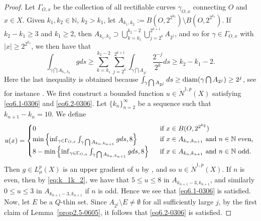 \documentclass[10pt]{amsart}
\numberwithin{equation}{section}
\newcommand{\N}{\mathbb{N}}
\begin{document}
\begin{proof}
Let $\Gamma_{O,x}$ be the collection of all rectifiable curves $\gamma_{O,x}$ connecting $O$ and $x\in X$.  Given $k_1,k_2\in\N$, $k_2>k_1$, let $A_{k_1,k_2}:=B(O,2^{2^{k_2}})\setminus B(O,2^{2^{k_1}})$. If $k_2-k_1\ge 3$ and $k_1\ge 2$, then $A_{k_1,k_2}\supset\bigcup_{k=k_1}^{k_2-2}\bigcup_{j=2^k}^{2^{k+1}}A_{2^j}$, and so for $\gamma\in\Gamma_{O,x}$ with $|x|\ge 2^{2^{k_2}}$, we then have that   
\begin{equation}\label{eq:k_1k_2}
		\int_{\gamma \bigcap A_{k_1,k_2}} gds \ge\sum_{k=k_1}^{k_2-2} \sum_{j=2^k}^{2^{k+1}}\int_{\gamma\bigcap A_{2^j}}\frac{2^{-j}}{2^k}ds \geq k_2-k_1-2.
\end{equation}
 Here the last inequality is  obtained because $\int_{\gamma\bigcap A_{2^j}}ds \geq  \text{\rm diam}(\gamma\bigcap A_{2^j})\geq 2^j$, see for instance \cite[Proposition 5.1.11]{pekka}.
	We first construct a bounded function $u\in \dot N^{1,p}(X)$ satisfying \eqref{eq6.1-0306} and \eqref{eq6.2-0306}.
	Let $\{k_n\}_{n=2}^\infty$ be a sequence such that $k_{n+1}-k_{n}=10$.
	 We define
 \[ u(x)= \begin{cases}
        0 & \text{\rm \ \ if $x\in B(O,2^{2^{k_2}})$}\\
		 \min\left\{ \inf_{\gamma\in \Gamma_{O,x}}\int_{\gamma \bigcap A_{k_{n},k_{n+1}}}gds, 8\right\} & \text{\rm \ \ if $x\in A_{k_n,k_{n+1}}$ and $n\in\mathbb N$ even, }\\
		8-  \min\left\{ \inf_{\gamma\in \Gamma_{O,x}}\int_{\gamma \bigcap A_{k_{n},k_{n+1}}}gds, 8\right\} & \text{\rm \ \ if $x\in A_{k_n,k_{n+1}}$ and $n\in\mathbb N$ odd}.
		\end{cases}
  \]
 Then $g\in L^p_\mu(X)$ is an upper gradient of $u$ by \cite[Page 188-189]{pekka}, and so $u\in \dot N^{1,p}(X)$. If $n$ is even, then by \eqref{eq:k_1k_2}, we have that $5\le u\le 8$ in $A_{k_{n+1}-3,k_{n+1}}$, and similarly $0\le u\le 3$ in $A_{k_{n+1}-3,k_{n+1}}$ if $n$ is odd.  Hence we see that \eqref{eq6.1-0306} is satisfied.  Now, let $E$ be a $Q$-thin set. Since $A_{2^j}\setminus E\neq \emptyset$ for all sufficiently large $j$, by the first claim of Lemma~\ref{prop2.5-0605}, it follows that \eqref{eq6.2-0306} is satisfied.
	

\end{proof}
\end{document}
